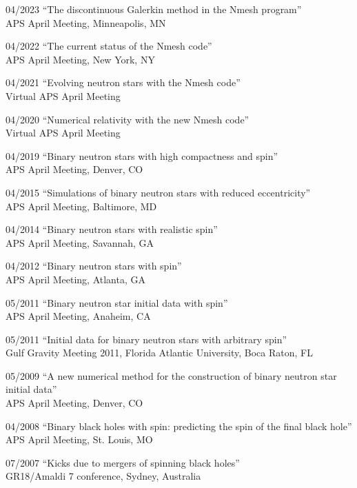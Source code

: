 \documentclass[11pt]{article}
\begin{document}
\begin{list}{}{\leftmargin=5em =1.5em \rightmargin=-8em =7em}
\item[04/2023] ``The discontinuous Galerkin method in the Nmesh program''\\
		{APS April Meeting, Minneapolis, MN}
\item[04/2022] ``The current status of the Nmesh code''\\
		{APS April Meeting, New York, NY}
\item[04/2021] ``Evolving neutron stars with the Nmesh code''\\
		{Virtual APS April Meeting}
\item[04/2020] ``Numerical relativity with the new Nmesh code''\\
		{Virtual APS April Meeting}
\item[04/2019] ``Binary neutron stars with high compactness and spin''\\
		{APS April Meeting, Denver, CO}
\item[04/2015] ``Simulations of binary neutron stars with reduced
		 eccentricity''\\
		{APS April Meeting, Baltimore, MD}
\item[04/2014] ``Binary neutron stars with realistic spin''\\
		{APS April Meeting, Savannah, GA}
\item[04/2012] ``Binary neutron stars with spin''\\
		{APS April Meeting, Atlanta, GA}
\item[05/2011] ``Binary neutron star initial data with spin''\\
		{APS April Meeting, Anaheim, CA}
\item[05/2011] ``Initial data for binary neutron stars with arbitrary spin''\\
                {Gulf Gravity Meeting 2011},
		{Florida Atlantic University, Boca Raton, FL}
\item[05/2009] ``A new numerical method for the construction of binary
		neutron star initial data''\\
		{APS April Meeting, Denver, CO}
\item[04/2008] ``Binary black holes with spin: predicting the spin of
                 the final black hole''\\
		{APS April Meeting, St. Louis, MO}
\item[07/2007] ``Kicks due to mergers of spinning black holes''\\
		{GR18/Amaldi 7 conference, Sydney, Australia}

\end{list}
\end{document}
